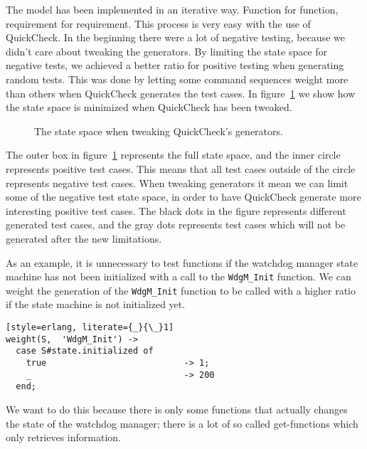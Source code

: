 
The model has been implemented in an iterative way. Function for
function, requirement for requirement. This process is very easy with
the use of QuickCheck.  In the beginning there were a lot of negative
testing, because we didn't care about tweaking the generators.
By limiting the state space for negative tests, we achieved a better
ratio for positive testing when generating random tests. This was done
by letting some command sequences weight more than others when
QuickCheck generates the test cases. In
figure~\ref{QUICKCHECK:TWEAKING} we show how the state space is
minimized when QuickCheck has been tweaked.

\begin{figure}[!ht]
  \begin{center}
    \begin{minipage}[b]{0.6\linewidth}
      
    \end{minipage}
  \end{center}
  \caption{The state space when tweaking QuickCheck's generators.}
  \label{QUICKCHECK:TWEAKING}
\end{figure}
The outer box in figure~\ref{QUICKCHECK:TWEAKING} represents the full
state space, and the inner circle represents positive test cases. This
means that all test cases outside of the circle represents negative
test cases. When tweaking generators it mean we can limit some of the
negative test state space, in order to have QuickCheck generate more
interesting positive test cases. The black dots in the figure
represents different generated test cases, and the gray dots
represents test cases which will not be generated after the new
limitations.

As an example, it is unnecessary to test functions if the watchdog
manager state machine has not been initialized with a call to the
\lstinline!WdgM_Init! function. We can weight the generation
of the \lstinline!WdgM_Init! function to be called with a higher ratio
if the state machine is not initialized yet.

\begin{lstlisting}[style=erlang, literate={_}{\_}1]
weight(S,  'WdgM_Init') ->
  case S#state.initialized of
    true                           -> 1;
    _                              -> 200
  end;
\end{lstlisting}

We want to do this because there is only some functions that actually
changes the state of the watchdog manager; there is a lot of so called
get-functions which only retrieves information.

